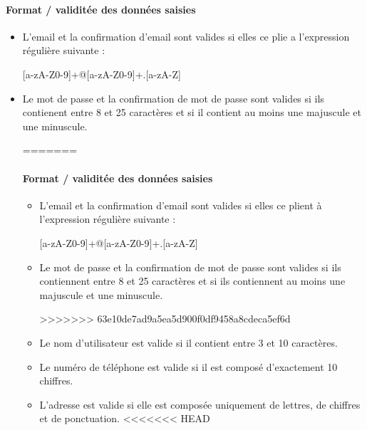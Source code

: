 \documentclass{article}
\begin{document}
\begin{itemize}
\begin{itemize}
\paragraph{Format / validitée des données saisies}
\begin{itemize}
\item L'email  et la confirmation d'email sont valides si elles ce plie a l'expression régulière
  suivante :

[a-zA-Z0-9]+@[a-zA-Z0-9]+.[a-zA-Z]

\item Le mot de passe et la confirmation de mot de passe sont valides si ils contienent entre 8 et 25
  caractères et si il contient au moins une majuscule et une minuscule.

=======

\paragraph{Format / validitée des données saisies}
\begin{itemize}
\item L'email  et la confirmation d'email sont valides si elles ce plient à l'expression régulière
  suivante :

[a-zA-Z0-9]+@[a-zA-Z0-9]+.[a-zA-Z]

\item Le mot de passe et la confirmation de mot de passe sont valides si ils contiennent entre 8 et 25
  caractères et si ils contiennent au moins une majuscule et une minuscule.

>>>>>>> 63e10de7ad9a5ea5d900f0df9458a8cdeca5ef6d
\item Le nom d'utilisateur est valide si il contient entre 3 et 10
  caractères.

\item Le numéro de téléphone est valide si il est composé d'exactement
  10 chiffres.

\item L'adresse est valide si elle est composée uniquement de lettres,
  de chiffres et de ponctuation.
<<<<<<< HEAD
\end{itemize}



\end{itemize}
\end{itemize}
\end{itemize}
\end{document}
